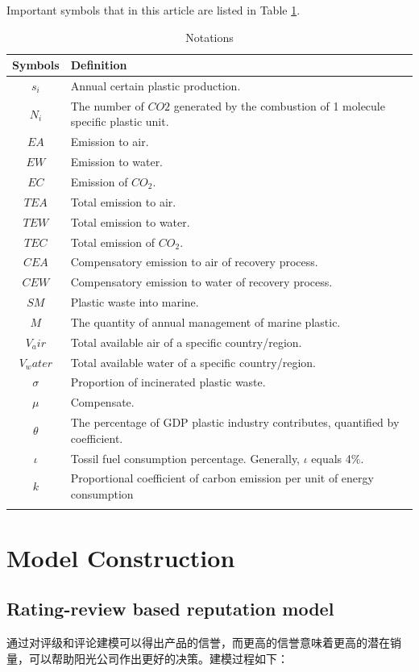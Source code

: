 \documentclass{mcmthesis}
\begin{document}
Important symbols that in this article are listed in Table \ref{notation}.
\begin{table}[H] 
	\caption{Notations} 
	\center
	\begin{tabular}{cp{}}
		\toprule 
		Symbols &Definition  \\ 
		\midrule 
		$s_i $& Annual certain plastic production.  \\ 
		$N_i$ & The number of $CO2$ generated by the combustion of 1 molecule specific plastic unit. \\ 
		$EA$ & Emission to air. \\ 
		$EW$ & Emission to water.\\
		$EC$ & Emission of $CO_2$.\\
		$TEA$ & Total emission to air.\\
		$TEW$ & Total emission to water.\\
		$TEC$ & Total emission of $CO_2$.\\
		$CEA$ & Compensatory emission to air of recovery process.\\
		$CEW$ & Compensatory emission to water of recovery process.\\
		$SM$ & Plastic waste into marine.\\
		$M$ & The quantity of annual management of marine plastic.\\
		$V_air$ & Total available air of a specific country/region.\\
		$V_water$ & Total available water of a specific country/region.\\
		$\sigma$ & Proportion of incinerated plastic waste.\\
		$\mu$ & Compensate.\\
		$\theta$ & The percentage of GDP plastic industry contributes, quantified by coefficient.\\
		$\iota$ & Tossil fuel consumption percentage. Generally, $\iota$ equals 4\%.\\
		$k$ & Proportional coefficient of carbon emission per unit of
energy consumption\\
		\bottomrule 
		\label{notation}
	\end{tabular} 
\end{table}

\section{Model Construction}
\label{lp}
\subsection{Rating-review based reputation model}
通过对评级和评论建模可以得出产品的信誉，而更高的信誉意味着更高的潜在销量，可以帮助阳光公司作出更好的决策。建模过程如下：
\end{document}
